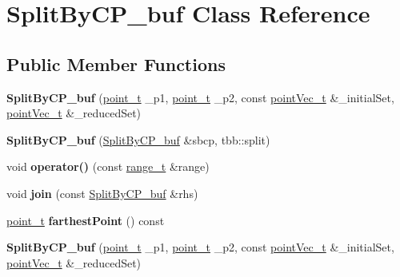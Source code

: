 \hypertarget{classSplitByCP__buf}{}\section{Split\+By\+C\+P\+\_\+buf Class Reference}
\label{classSplitByCP__buf}
\subsection*{Public Member Functions}
\begin{DoxyCompactItemize}
\item 
\hypertarget{classSplitByCP__buf_ae6e24c604e94f26b35948fceab1f97cd}{}{\bfseries Split\+By\+C\+P\+\_\+buf} (\hyperlink{structutil_1_1point}{point\+\_\+t} \+\_\+p1, \hyperlink{structutil_1_1point}{point\+\_\+t} \+\_\+p2, const \hyperlink{classtbb_1_1concurrent__vector}{point\+Vec\+\_\+t} \&\+\_\+initial\+Set, \hyperlink{classtbb_1_1concurrent__vector}{point\+Vec\+\_\+t} \&\+\_\+reduced\+Set)\label{classSplitByCP__buf_ae6e24c604e94f26b35948fceab1f97cd}

\item 
\hypertarget{classSplitByCP__buf_a64ff270585ac42b4fb2b150b25489935}{}{\bfseries Split\+By\+C\+P\+\_\+buf} (\hyperlink{classSplitByCP__buf}{Split\+By\+C\+P\+\_\+buf} \&sbcp, tbb\+::split)\label{classSplitByCP__buf_a64ff270585ac42b4fb2b150b25489935}

\item 
\hypertarget{classSplitByCP__buf_a1c5aa41c1d75ad11aa1afb03fe011a43}{}void {\bfseries operator()} (const \hyperlink{classtbb_1_1blocked__range}{range\+\_\+t} \&range)\label{classSplitByCP__buf_a1c5aa41c1d75ad11aa1afb03fe011a43}

\item 
\hypertarget{classSplitByCP__buf_aa26b2bf50451fd4b09009c1ba481e379}{}void {\bfseries join} (const \hyperlink{classSplitByCP__buf}{Split\+By\+C\+P\+\_\+buf} \&rhs)\label{classSplitByCP__buf_aa26b2bf50451fd4b09009c1ba481e379}

\item 
\hypertarget{classSplitByCP__buf_a9c5c058b2f3f63c5a175fdc55fb084a0}{}\hyperlink{structutil_1_1point}{point\+\_\+t} {\bfseries farthest\+Point} () const \label{classSplitByCP__buf_a9c5c058b2f3f63c5a175fdc55fb084a0}

\item 
\hypertarget{classSplitByCP__buf_ae6e24c604e94f26b35948fceab1f97cd}{}{\bfseries Split\+By\+C\+P\+\_\+buf} (\hyperlink{structutil_1_1point}{point\+\_\+t} \+\_\+p1, \hyperlink{structutil_1_1point}{point\+\_\+t} \+\_\+p2, const \hyperlink{classtbb_1_1concurrent__vector}{point\+Vec\+\_\+t} \&\+\_\+initial\+Set, \hyperlink{classtbb_1_1concurrent__vector}{point\+Vec\+\_\+t} \&\+\_\+reduced\+Set)\label{classSplitByCP__buf_ae6e24c604e94f26b35948fceab1f97cd}


\end{DoxyCompactItemize}

